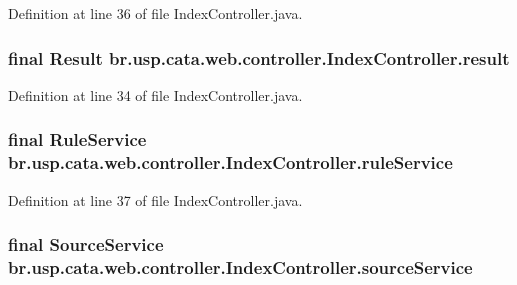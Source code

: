 Definition at line 36 of file Index\+Controller.\+java.

\hypertarget{classbr_1_1usp_1_1cata_1_1web_1_1controller_1_1_index_controller_ace414d68bfba9031fb373f7b4baa0fd2}{
\subsubsection[{result}]{\setlength{\rightskip}{0pt plus 5cm}final Result br.\+usp.\+cata.\+web.\+controller.\+Index\+Controller.\+result\hspace{0.3cm}{\ttfamily [private]}}}\label{classbr_1_1usp_1_1cata_1_1web_1_1controller_1_1_index_controller_ace414d68bfba9031fb373f7b4baa0fd2}


Definition at line 34 of file Index\+Controller.\+java.

\hypertarget{classbr_1_1usp_1_1cata_1_1web_1_1controller_1_1_index_controller_a4f6fce52bf3206bc01fea51436892c66}{
\subsubsection[{rule\+Service}]{\setlength{\rightskip}{0pt plus 5cm}final {\bf Rule\+Service} br.\+usp.\+cata.\+web.\+controller.\+Index\+Controller.\+rule\+Service\hspace{0.3cm}{\ttfamily [private]}}}\label{classbr_1_1usp_1_1cata_1_1web_1_1controller_1_1_index_controller_a4f6fce52bf3206bc01fea51436892c66}


Definition at line 37 of file Index\+Controller.\+java.

\hypertarget{classbr_1_1usp_1_1cata_1_1web_1_1controller_1_1_index_controller_aa8494d0f32eb44ed68bb0628b8295e14}{
\subsubsection[{source\+Service}]{\setlength{\rightskip}{0pt plus 5cm}final {\bf Source\+Service} br.\+usp.\+cata.\+web.\+controller.\+Index\+Controller.\+source\+Service\hspace{0.3cm}{\ttfamily [private]}}}\label{classbr_1_1usp_1_1cata_1_1web_1_1controller_1_1_index_controller_aa8494d0f32eb44ed68bb0628b8295e14}


